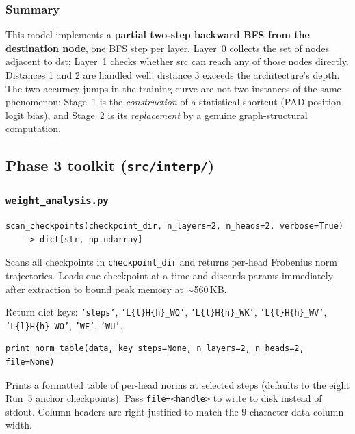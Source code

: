 \documentclass[11pt, a4paper]{article}
\begin{document}
\subsubsection*{Summary}

This model implements a \textbf{partial two-step backward BFS from the
destination node}, one BFS step per layer.  Layer~0 collects the set of nodes
adjacent to dst; Layer~1 checks whether src can reach any of those nodes
directly.  Distances 1 and 2 are handled well; distance 3 exceeds the
architecture's depth.  The two accuracy jumps in the training curve are not
two instances of the same phenomenon: Stage~1 is the \emph{construction} of a
statistical shortcut (PAD-position logit bias), and Stage~2 is its
\emph{replacement} by a genuine graph-structural computation.

\subsection{Phase 3 toolkit (\texttt{src/interp/})}

\subsubsection{\texttt{weight\_analysis.py}}

\begin{lstlisting}
scan_checkpoints(checkpoint_dir, n_layers=2, n_heads=2, verbose=True)
    -> dict[str, np.ndarray]
\end{lstlisting}

Scans all checkpoints in \texttt{checkpoint\_dir} and returns per-head
Frobenius norm trajectories. Loads one checkpoint at a time and discards
params immediately after extraction to bound peak memory at $\sim$560\,KB.

Return dict keys: \texttt{'steps'}, \texttt{'L\{l\}H\{h\}\_WQ'},
\texttt{'L\{l\}H\{h\}\_WK'}, \texttt{'L\{l\}H\{h\}\_WV'},
\texttt{'L\{l\}H\{h\}\_WO'}, \texttt{'WE'}, \texttt{'WU'}.

\begin{lstlisting}
print_norm_table(data, key_steps=None, n_layers=2, n_heads=2, file=None)
\end{lstlisting}

Prints a formatted table of per-head norms at selected steps (defaults to the
eight Run~5 anchor checkpoints). Pass \texttt{file=<handle>} to write to disk
instead of stdout. Column headers are right-justified to match the 9-character
data column width.
\end{document}
